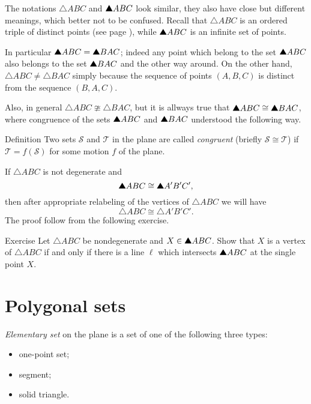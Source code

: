 The notations $\triangle ABC$ and $\solidtriangle ABC$ look similar,
they also have close but different meanings, 
which better not to be confused.
Recall that $\triangle ABC$ is an ordered triple of distinct points
(see page \pageref{page:def:triangle}),
while $\solidtriangle ABC$ is an infinite set of points.

In particular $\solidtriangle ABC=\solidtriangle BAC$; indeed any point which belong to the set $\solidtriangle ABC$ 
also belongs to the set $\solidtriangle BAC$
and the other way around.
On the other hand,
$\triangle ABC\ne\triangle BAC$ simply because the sequence of points $(A,B,C)$ is distinct from the sequence $(B,A,C)$.

Also, in general  $\triangle ABC\ncong\triangle BAC$, but it is allways true that $\solidtriangle ABC\cong\solidtriangle BAC$, where congruence of the sets $\solidtriangle ABC$ and $\solidtriangle BAC$ understood the following way.

\begin{thm}{Definition}\label{def:cong-sets}
Two sets $\mathcal{S}$ and $\mathcal{T}$ in the plane  
are called \emph{congruent} 
(briefly $\mathcal{S}\cong \mathcal{T}$)
if 
$\mathcal{T}=f(\mathcal{S})$ for some motion $f$ of the plane.
\end{thm}

If $\triangle ABC$ is not degenerate
and \[\solidtriangle ABC\cong \solidtriangle A'B'C',\]
then after appropriate relabeling of the vertices of $\triangle ABC$ 
we will have 
\[\triangle ABC\cong \triangle A'B'C'.\]
The proof follow from the following exercise.

\begin{thm}{Exercise}\label{ex:vertex}
Let $\triangle ABC$ be nondegenerate and $X\z\in \solidtriangle ABC$.
Show that $X$ is a vertex of $\triangle ABC$
if and only if there is a line $\ell$ which intersects $\solidtriangle ABC$
at the single point $X$.
\end{thm}

\section*{Polygonal sets}

\emph{Elementary set} on the plane 
is a set of one of the following three types:
\begin{itemize}
 \item one-point set;
 \item segment;
 \item solid triangle.
\end{itemize}


